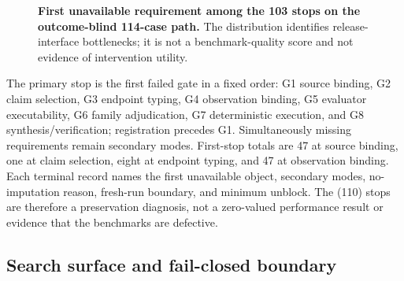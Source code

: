 \begin{figure}[ht]
\centering
{}
\caption{\textbf{First unavailable requirement among the 103 stops on the outcome-blind 114-case path.} The distribution identifies release-interface bottlenecks; it is not a benchmark-quality score and not evidence of intervention utility.}
\label{fig:reviewer-stop-bars}
\end{figure}

The primary stop is the first failed gate in a fixed order: G1 source binding, G2 claim selection, G3 endpoint typing, G4 observation binding, G5 evaluator executability, G6 family adjudication, G7 deterministic execution, and G8 synthesis/verification; registration precedes G1.  Simultaneously missing requirements remain secondary modes.  First-stop totals are 47 at source binding, one at claim selection, eight at endpoint typing, and 47 at observation binding.  Each terminal record names the first unavailable object, secondary modes, no-imputation reason, fresh-run boundary, and minimum unblock.  The (110) stops are therefore a preservation diagnosis, not a zero-valued performance result or evidence that the benchmarks are defective.

\subsection{Search surface and fail-closed boundary}
\label{app:stop-search-boundary}

